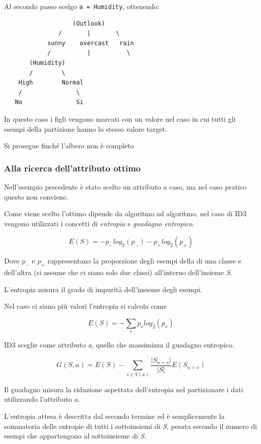 Al secondo passo scelgo \texttt{a\ =\ Humidity}, ottenendo:

\begin{verbatim}
                   (Outlook)
               /       |       \
            sunny    overcast   rain
            /          |          \
       (Humidity)
       /        \
    High        Normal
    /               \
   No               Si
\end{verbatim}

In questo caso i figli vengono marcati con un valore nel
caso in cui tutti gli esempi della partizione hanno lo stesso valore
target.

Si prosegue finché l'albero non è completo

\subsubsection{Alla ricerca dell'attributo ottimo}\label{alla-ricerca-dellattributo-ottimo}

Nell'esempio precedente è stato scelto un attributo a caso, ma nel caso
pratico questo non conviene.

Come viene scelto l'ottimo dipende da algoritmo ad algoritmo, nel caso
di ID3 vengono utilizzati i concetti di \emph{entropia} e \emph{guadagno
entropico}.

$$
E(S) = -p_{-}log_2(p_-) -p_{+}log_2(p_+)
$$

Dove $p_-$ e $p_+$ rappresentano la proporzione degli esempi della di una
classe e dell'altra (si assume che ci siano solo due classi) all'interno
dell'insieme \textit{S}.

L'entropia misura il grado di impurità dell'insieme degli esempi.

Nel caso ci siano più valori l'entropia si calcola come

$$
E(S) = - \sum_v p_vlog_2(p_v)
$$

ID3 sceglie come attributo \emph{a}, quello che massimizza il guadagno
entropico.

$$
G(S,a) = E(S) - \sum_{v \in V(a)} \frac{|S_{a = v}|}{|S|} E(S_{a=v})
$$

Il guadagno misura la riduzione aspettata dell'entropia nel partizionare
i dati utilizzando l'attributo \emph{a}.

L'entropia attesa è descritta dal secondo termine ed è semplicemente la
sommatoria delle entropie di tutti i sottoinsiemi di \emph{S}, pesata
secondo il numero di esempi che appartengono al sottoinsieme di
\emph{S}.

